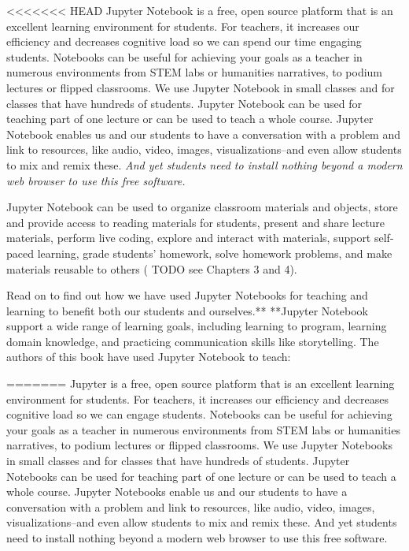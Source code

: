 \documentclass[]{book}
\begin{document}
\textless{}\textless{}\textless{}\textless{}\textless{}\textless{}\textless{}
HEAD Jupyter Notebook is a free, open source platform that is an
excellent learning environment for students. For teachers, it increases
our efficiency and decreases cognitive load so we can spend our time
engaging students. Notebooks can be useful for achieving your goals as a
teacher in numerous environments from STEM labs or humanities
narratives, to podium lectures or flipped classrooms. We use Jupyter
Notebook in small classes and for classes that have hundreds of
students. Jupyter Notebook can be used for teaching part of one lecture
or can be used to teach a whole course. Jupyter Notebook enables us and
our students to have a conversation with a problem and link to
resources, like audio, video, images, visualizations--and even allow
students to mix and remix these. \emph{And yet students need to install
nothing beyond a modern web browser to use this free software.}

Jupyter Notebook can be used to organize classroom materials and
objects, store and provide access to reading materials for students,
present and share lecture materials, perform live coding, explore and
interact with materials, support self-paced learning, grade students'
homework, solve homework problems, and make materials reusable to others
( TODO see Chapters 3 and 4).

Read on to find out how we have used Jupyter Notebooks for teaching and
learning to benefit both our students and ourselves.** **Jupyter
Notebook support a wide range of learning goals, including learning to
program, learning domain knowledge, and practicing communication skills
like storytelling. The authors of this book have used Jupyter Notebook
to teach:

======= Jupyter is a free, open source platform that is an excellent
learning environment for students. For teachers, it increases our
efficiency and decreases cognitive load so we can engage students.
Notebooks can be useful for achieving your goals as a teacher in
numerous environments from STEM labs or humanities narratives, to podium
lectures or flipped classrooms. We use Jupyter Notebooks in small
classes and for classes that have hundreds of students. Jupyter
Notebooks can be used for teaching part of one lecture or can be used to
teach a whole course. Jupyter Notebooks enable us and our students to
have a conversation with a problem and link to resources, like audio,
video, images, visualizations--and even allow students to mix and remix
these. And yet students need to install nothing beyond a modern web
browser to use this free software.
\end{document}
